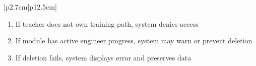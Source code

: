 \begin{table}[H]
\begin{tabular}{|p{2.7cm}|p{12.5cm}|}
\begin{minipage}[t]{\linewidth}
                                      \begin{enumerate}[topsep=0pt,itemsep=1pt,parsep=0pt,partopsep=0pt]
                                          \item If teacher does not own training path, system denies access
                                          \item If module has active engineer progress, system may warn or prevent deletion
                                          \item If deletion fails, system displays error and preserves data
                                      \end{enumerate}
                                  \end{minipage} \\
        \hline
    \end{tabular}
    \label{tab:teacher-delete-module}
\end{table}
